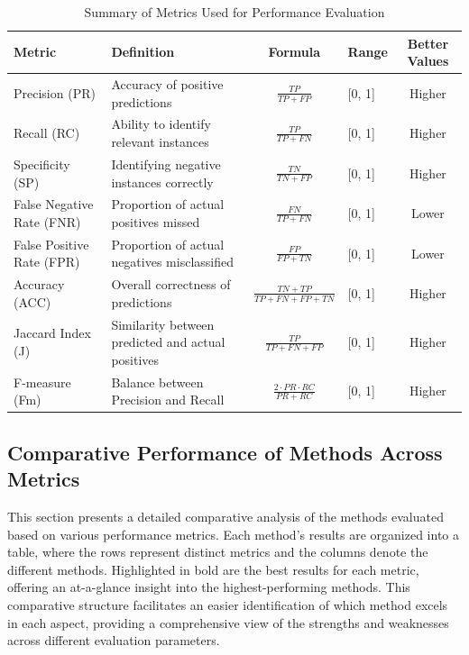 \documentclass{article}
\begin{document}
\renewcommand{\arraystretch}{1.5} %
\begin{table}[H]
	\centering
	\caption{Summary of Metrics Used for Performance Evaluation}
	\label{tab:metrics_summary}
	\vspace{0.4cm}
	\begin{tabular}{@{}p{3cm}p{4cm}c p{2cm}c@{}}
		\toprule
		\textbf{Metric} & \textbf{Definition} & \textbf{Formula} & \textbf{Range} & \textbf{Better Values} \\ 
		\midrule
		Precision (PR) & Accuracy of positive predictions & $\frac{TP}{TP + FP}$ & [0, 1] & Higher \\ 
		Recall (RC) & Ability to identify relevant instances & $\frac{TP}{TP + FN}$ & [0, 1] & Higher \\ 
		Specificity (SP) & Identifying negative instances correctly & $\frac{TN}{TN + FP}$ & [0, 1] & Higher \\ 
		False Negative Rate (FNR) & Proportion of actual positives missed & $\frac{FN}{TP + FN}$ & [0, 1] & Lower \\ 
		False Positive Rate (FPR) & Proportion of actual negatives misclassified & $\frac{FP}{FP + TN}$ & [0, 1] & Lower \\ 
		Accuracy (ACC) & Overall correctness of predictions & $\frac{TN + TP}{TP + FN + FP + TN}$ & [0, 1] & Higher \\ 
		Jaccard Index (J) & Similarity between predicted and actual positives & $\frac{TP}{TP + FN + FP}$ & [0, 1] & Higher \\ 
		F-measure (Fm) & Balance between Precision and Recall & $\frac{2 \cdot PR \cdot RC}{PR + RC}$ & [0, 1] & Higher \\ 
		\bottomrule
	\end{tabular}
\end{table}

\subsection{Comparative Performance of Methods Across Metrics}

This section presents a detailed comparative analysis of the methods evaluated based on various performance metrics. Each method's results are organized into a table, where the rows represent distinct metrics and the columns denote the different methods. Highlighted in bold are the best results for each metric, offering an at-a-glance insight into the highest-performing methods. This comparative structure facilitates an easier identification of which method excels in each aspect, providing a comprehensive view of the strengths and weaknesses across different evaluation parameters.
\\
\end{document}
